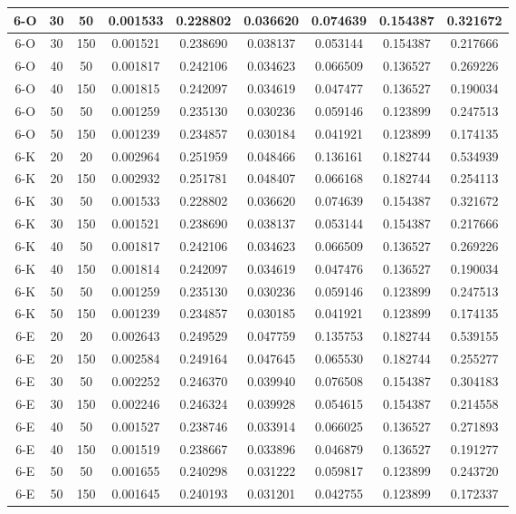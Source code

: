 \begin{center}
\begin{longtable}{|c|c|c|c|c|c|c|c|c|}
	\hline 6-O &	30 &	50	&	0.001533 &	0.228802 &	0.036620 &	0.074639 &	0.154387 &	0.321672 \\
	\hline 6-O &	30 &	150	&	0.001521 &	0.238690 &	0.038137 &	0.053144 &	0.154387 &	0.217666 \\
	\hline 6-O &	40 &	50	&	0.001817 &	0.242106 &	0.034623 &	0.066509 &	0.136527 &	0.269226 \\
	\hline 6-O &	40 &	150	&	0.001815 &	0.242097 &	0.034619 &	0.047477 &	0.136527 &	0.190034 \\
	\hline 6-O &	50 &	50	&	0.001259 &	0.235130 &	0.030236 &	0.059146 &	0.123899 &	0.247513 \\
	\hline 6-O &	50 &	150	&	0.001239 &	0.234857 &	0.030184 &	0.041921 &	0.123899 &	0.174135 \\
	\hline 6-K &	20 &	20	&	0.002964 &	0.251959 &	0.048466 &	0.136161 &	0.182744 &	0.534939 \\
	\hline 6-K &	20 &	150	&	0.002932 &	0.251781 &	0.048407 &	0.066168 &	0.182744 &	0.254113 \\
	\hline 6-K &	30 &	50	&	0.001533 &	0.228802 &	0.036620 &	0.074639 &	0.154387 &	0.321672 \\
	\hline 6-K &	30 &	150	&	0.001521 &	0.238690 &	0.038137 &	0.053144 &	0.154387 &	0.217666 \\
	\hline 6-K &	40 &	50	&	0.001817 &	0.242106 &	0.034623 &	0.066509 &	0.136527 &	0.269226 \\
	\hline 6-K &	40 &	150	&	0.001814 &	0.242097 &	0.034619 &	0.047476 &	0.136527 &	0.190034 \\
	\hline 6-K &	50 &	50	&	0.001259 &	0.235130 &	0.030236 &	0.059146 &	0.123899 &	0.247513 \\
	\hline 6-K &	50 &	150	&	0.001239 &	0.234857 &	0.030185 &	0.041921 &	0.123899 &	0.174135 \\
	\hline 6-E &	20 &	20	&	0.002643 &	0.249529 &	0.047759 &	0.135753 &	0.182744 &	0.539155 \\
	\hline 6-E &	20 &	150	&	0.002584 &	0.249164 &	0.047645 &	0.065530 &	0.182744 &	0.255277 \\
	\hline 6-E &	30 &	50	&	0.002252 &	0.246370 &	0.039940 &	0.076508 &	0.154387 &	0.304183 \\
	\hline 6-E &	30 &	150	&	0.002246 &	0.246324 &	0.039928 &	0.054615 &	0.154387 &	0.214558 \\
	\hline 6-E &	40 &	50	&	0.001527 &	0.238746 &	0.033914 &	0.066025 &	0.136527 &	0.271893 \\
	\hline 6-E &	40 &	150	&	0.001519 &	0.238667 &	0.033896 &	0.046879 &	0.136527 &	0.191277 \\
	\hline 6-E &	50 &	50	&	0.001655 &	0.240298 &	0.031222 &	0.059817 &	0.123899 &	0.243720 \\
	\hline 6-E &	50 &	150	&	0.001645 &	0.240193 &	0.031201 &	0.042755 &	0.123899 &	0.172337 \\
	\hline
\end{longtable} 
\end{center}

